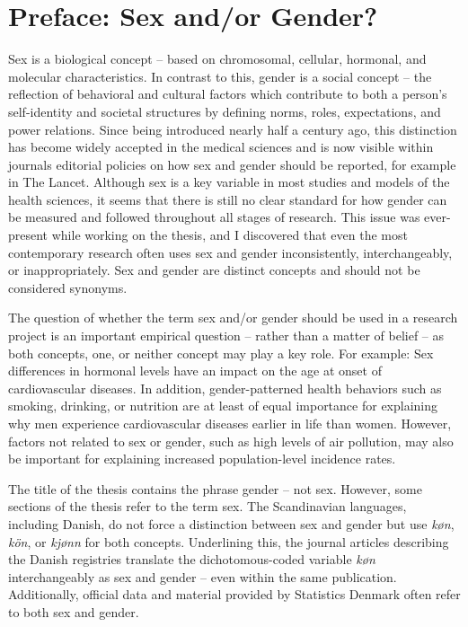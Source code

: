 


\chapter{Preface: Sex and/or Gender?}

Sex is a biological concept -- based on chromosomal, cellular, hormonal, 
and molecular characteristics.\citep{clayton2016reporting} In contrast 
to this, gender is a social concept -- the reflection of behavioral 
and cultural factors which contribute to both a person's self-identity 
and societal structures by defining norms, roles, expectations, and 
power relations.\citep{clayton2016reporting} Since being introduced 
nearly half a century ago, this distinction has become widely accepted 
in the medical sciences and is now visible within journals editorial 
policies on how sex and gender should be reported, for example in The 
Lancet.\citep{schiebinger2016editorial} Although sex is a key variable 
in most studies and models of the health sciences, it seems that there 
is still no clear standard for how gender can be measured and followed 
throughout all stages of research.\citep{schiebinger2016gender} This 
issue was ever-present while working on the thesis, and I discovered 
that even the most contemporary research often uses sex and gender 
inconsistently, interchangeably, or inappropriately. Sex and gender 
are distinct concepts and should not be considered synonyms.

The question of whether the term sex and/or gender should be used in 
a research project is an important empirical question -- rather than a 
matter of belief -- as both concepts, one, or neither concept may play 
a key role.\citep{krieger2003genders} For example: Sex differences in 
hormonal levels have an impact on the age at onset of cardiovascular 
diseases.\citep{eskes2007women} In addition, gender-patterned health 
behaviors such as smoking, drinking, or nutrition are at least of 
equal importance for explaining why men experience cardiovascular 
diseases earlier in life than women.\citep{mosca2011sex} However, 
factors not related to sex or gender, such as high levels of air 
pollution, may also be important for explaining increased population-level 
incidence rates.\citep{cosselman2015environmental}

The title of the thesis contains the phrase gender -- not sex. 
However, some sections of the thesis refer to the term sex. 
The Scandinavian languages, including Danish, do not force a distinction 
between sex and gender but use \textit{k{\o}n}, \textit{k\"on}, or 
\textit{kj{\o}nn} for both concepts.\citep{widerberg1998translating}
Underlining this, the journal articles describing the Danish registries 
translate the dichotomous-coded variable \textit{k{\o}n} interchangeably 
as sex and gender -- even within the same publication.\citep{pedersen2011,
sahl2011danish} Additionally, official data and material provided 
by Statistics Denmark often refer to both sex and gender. 

